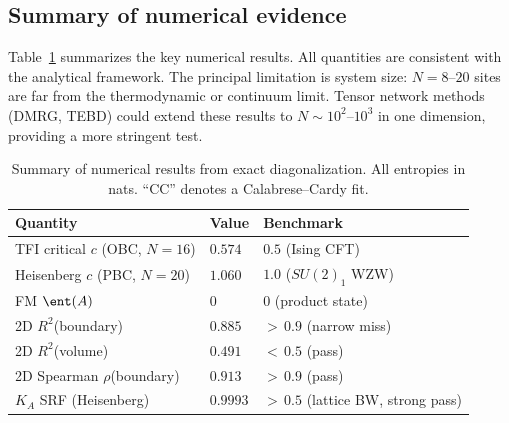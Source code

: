 \subsection{Summary of numerical evidence}
\label{sec:ed-summary}

Table~\ref{tab:numerics} summarizes the key numerical results.
All quantities are consistent with the analytical framework.
The principal limitation is system size: $N = 8$--$20$ sites are far
from the thermodynamic or continuum limit.  Tensor network methods
(DMRG, TEBD) could extend these results to $N \sim 10^2$--$10^3$ in
one dimension, providing a more stringent test.

\begin{table}
\caption{Summary of numerical results from exact diagonalization.
All entropies in nats.  ``CC'' denotes a Calabrese--Cardy fit.
\label{tab:numerics}}
\begin{ruledtabular}
\begin{tabular}{lll}
Quantity & Value & Benchmark \\ \hline
TFI critical $c$ (OBC, $N\!=\!16$) & $0.574$ & $0.5$ (Ising CFT) \\
Heisenberg $c$ (PBC, $N\!=\!20$) & $1.060$ & $1.0$ ($SU(2)_1$ WZW) \\
FM $\ent(A)$ & $0$ & $0$ (product state) \\
2D $R^2$(boundary) & $0.885$ & ${>}\,0.9$ (narrow miss) \\
2D $R^2$(volume) & $0.491$ & ${<}\,0.5$ (pass) \\
2D Spearman $\rho$(boundary) & $0.913$ & ${>}\,0.9$ (pass) \\
$K_A$ SRF (Heisenberg) & $0.9993$ & ${>}\,0.5$ (lattice BW, strong pass) \\
\end{tabular}
\end{ruledtabular}
\end{table}
